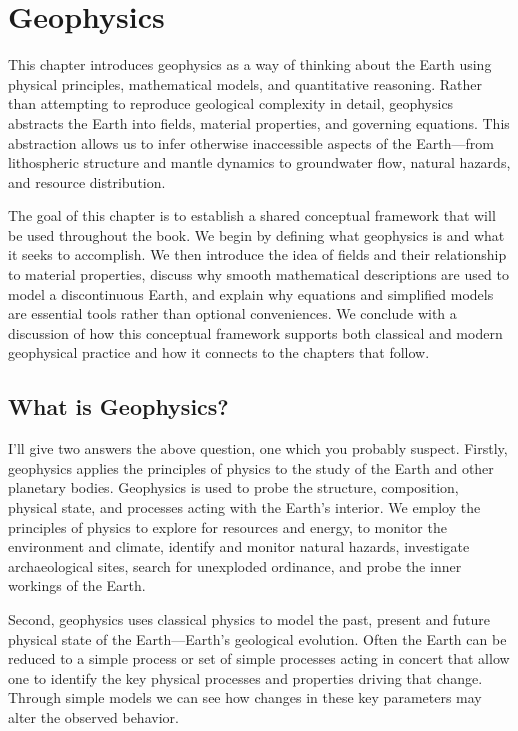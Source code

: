 \chapter{Geophysics}\label{ch:equations}

This chapter introduces geophysics as a way of thinking about the Earth using physical principles, mathematical models, and quantitative reasoning. Rather than attempting to reproduce geological complexity in detail, geophysics abstracts the Earth into fields, material properties, and governing equations. This abstraction allows us to infer otherwise inaccessible aspects of the Earth—from lithospheric structure and mantle dynamics to groundwater flow, natural hazards, and resource distribution.

The goal of this chapter is to establish a shared conceptual framework that will be used throughout the book. We begin by defining what geophysics is and what it seeks to accomplish. We then introduce the idea of fields and their relationship to material properties, discuss why smooth mathematical descriptions are used to model a discontinuous Earth, and explain why equations and simplified models are essential tools rather than optional conveniences. We conclude with a discussion of how this conceptual framework supports both classical and modern geophysical practice and how it connects to the chapters that follow.

\section{What is Geophysics?}
I'll give two answers the above question, one which you probably suspect.  Firstly, geophysics applies the principles of physics to the study of the Earth and other planetary bodies.  Geophysics is used to probe the structure, composition, physical state, and processes acting with the Earth's interior.  We employ the principles of physics to explore for resources and energy, to monitor the environment and climate, identify and monitor natural hazards, investigate archaeological sites, search for unexploded ordinance, and probe the inner workings of the Earth.

Second, geophysics uses classical physics to model the past, present and future physical state of the Earth---Earth's geological evolution.  Often the Earth can be reduced to a simple process or set of simple processes acting in concert that allow one to identify the key physical processes and properties driving that change.  Through simple models we can see how changes in these key parameters may alter the observed behavior.

